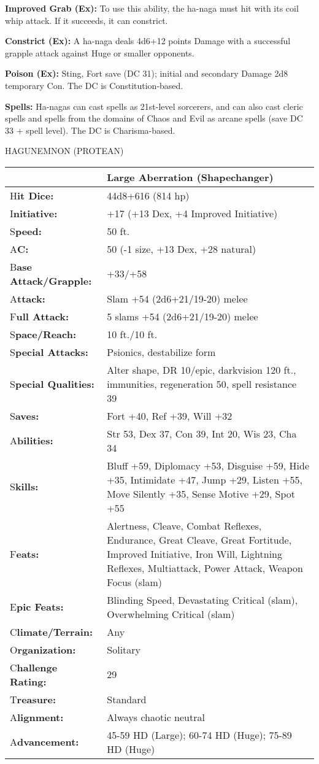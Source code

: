 \documentclass{article}
\begin{document}
{\textbf{Improved Grab (Ex):} To use this ability, the ha-naga must hit with its 
coil whip attack. If it succeeds, it can constrict. 

\textbf{Constrict (Ex):} A ha-naga deals 4d6+12 points Damage with a successful 
grapple attack against Huge or smaller opponents. 

\textbf{Poison (Ex):} Sting, Fort save (DC 31); initial and secondary Damage 2d8 
temporary Con.  The DC is Constitution-based.

\textbf{Spells:} Ha-nagas can cast spells as 21st-level sorcerers, and can also 
cast cleric spells and spells from the domains of Chaos and Evil as arcane spells 
(save DC 33 + spell level). The DC is Charisma-based.

\vspace{12pt}
{\LARGE{}HAGUNEMNON (PROTEAN) }

\begin{tabular}{|>{\raggedright}p{64pt}|>{\raggedright}p{261pt}|}
\hline
  & Large Aberration (Shapechanger) \tabularnewline
\hline
H\textbf{it Dice:} & 44d8+616 (814 hp) \tabularnewline
\hline
I\textbf{nitiative:} & +17 (+13 Dex, +4 Improved Initiative) \tabularnewline
\hline
S\textbf{peed:} & 50 ft. \tabularnewline
\hline
A\textbf{C:} & 50 (-1 size, +13 Dex, +28 natural) \tabularnewline
\hline
B\textbf{ase Attack/Grapple:} & +33/+58\tabularnewline
\hline
A\textbf{ttack:} & Slam +54 (2d6+21/19-20) melee\tabularnewline
\hline
F\textbf{ull Attack:} & 5 slams +54 (2d6+21/19-20) melee\tabularnewline
\hline
S\textbf{pace/Reach:} & 10 ft./10 ft. \tabularnewline
\hline
S\textbf{pecial Attacks:} & Psionics, destabilize form \tabularnewline
\hline
S\textbf{pecial Qualities:} & Alter shape, DR 10/epic, darkvision 120 ft., immunities, 
regeneration 50, spell resistance 39 \tabularnewline
\hline
S\textbf{aves:} & Fort +40, Ref +39, Will +32 \tabularnewline
\hline
A\textbf{bilities:} & Str 53, Dex 37, Con 39, Int 20, Wis 23, Cha 34 \tabularnewline
\hline
S\textbf{kills:} & Bluff +59, Diplomacy +53, Disguise +59, Hide +35, Intimidate 
+47, Jump +29, Listen +55, Move Silently +35, Sense Motive +29, Spot +55\tabularnewline
\hline
F\textbf{eats:} & Alertness, Cleave, Combat Reflexes, Endurance, Great Cleave, 
Great Fortitude, Improved Initiative, Iron Will, Lightning Reflexes, Multiattack, 
Power Attack, Weapon Focus (slam) \tabularnewline
\hline
E\textbf{pic Feats:} & Blinding Speed, Devastating Critical (slam), Overwhelming 
Critical (slam) \tabularnewline
\hline
C\textbf{limate/Terrain:} & Any \tabularnewline
\hline
O\textbf{rganization:} & Solitary \tabularnewline
\hline
C\textbf{hallenge Rating:} & 29 \tabularnewline
\hline
T\textbf{reasure:} & Standard \tabularnewline
\hline
A\textbf{lignment:} & Always chaotic neutral \tabularnewline
\hline
A\textbf{dvancement:} & 45-59 HD (Large); 60-74 HD (Huge); 75-89 HD (Huge) \tabularnewline
\hline
\end{tabular}

}
\end{document}
